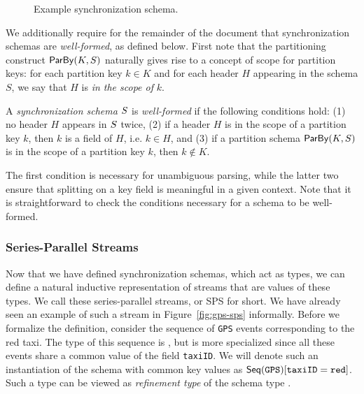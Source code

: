 \begin{figure}[t]
\centering
\scalebox{0.8}{
    \begin{tikzpicture}[sibling distance=11em,
      every node/.style = {shape=rectangle,
        rounded corners,
        draw, align=center}]]
      \node { \TopSchemaNode{\texttt{EndOfHour}} }
        child {
            \SchemaNode{\seqleaf{\texttt{GPS}}}{s2}
        }
        child {
            \SchemaNode{\relleaf{\texttt{RideCompleted}} }{s3}
        };
      \KeyByNode{\texttt{taxiID}}{k1}{s2}{s2};
    \end{tikzpicture}
}
\caption{Example synchronization schema.}
\label{fig:example-schema}
\end{figure}

We additionally require for the remainder of the document that synchronization schemas are \emph{well-formed}, as defined below. First note that the partitioning construct $\keyby{K}{S}$ naturally gives rise to a concept of
scope for partition keys: for each partition key $k \in K$ and for each
header $H$ appearing in the schema $S$,
we say that $H$ is \emph{in the scope of} $k$.
\begin{definition}
\label{def:well-formed-sync-schema}
A \emph{synchronization schema} $\ss$ is \emph{well-formed} if the following conditions hold: (1) no header $H$ appears in $\ss$ twice,
    (2) if a header $H$ is in the scope of a partition key $k$, then $k$ is a field of $H$, i.e. $k \in H$, and
    (3) if a partition schema $\keyby{K}{S}$ is in the scope of a partition key $k$, then $k \not \in K$.
    \end{definition}

The first condition is necessary for unambiguous parsing, while the latter two
ensure that splitting on a key field is meaningful in a given context.
Note that it is straightforward to check the conditions necessary for a schema to be well-formed.

\subsubsection{Series-Parallel Streams}
\label{sec:streams}

Now that we have defined synchronization schemas, which act as types, we can define a natural inductive representation of streams that are values of these types. We call these series-parallel streams, or SPS for short.
We have already seen an example of such a stream in Figure~\ref{fig:gps-sps} informally.
Before we formalize the definition, consider the sequence of \texttt{GPS} events corresponding
to the red taxi. The type of this sequence is , but is more specialized
since all these events share a common value of the field \texttt{taxiID}.
We will denote such an instantiation of the schema with common key values
as $\spstype{\texttt{taxiID}=\texttt{red}}{\seqleaf{\texttt{GPS}}}$. Such a type can
be viewed as {\em refinement type} of the schema type .

